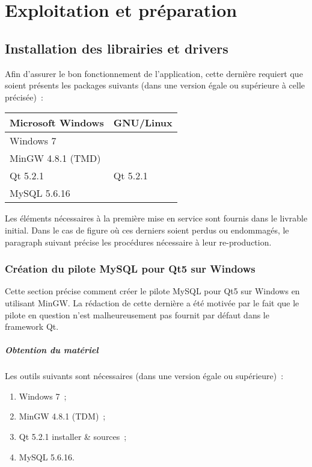 \chapter{Exploitation et préparation}

% 

\section{Installation des librairies et drivers}
Afin d'assurer le bon fonctionnement de l'application, cette dernière requiert que soient présents les packages suivants (dans une version égale ou supérieure à celle précisée)~:
\begin{tabularx}{\linewidth}{X X}
	\toprule
	Microsoft Windows	& GNU/Linux		\\
	\midrule
	Windows 7			&				\\
	MinGW 4.8.1 (TMD)	&				\\
	Qt 5.2.1			& Qt 5.2.1		\\
	MySQL 5.6.16		& 				\\
	\bottomrule
\end{tabularx}

Les éléments nécessaires à la première mise en service sont fournis dans le livrable initial.
Dans le cas de figure où ces derniers soient perdus ou endommagés, le paragraph suivant précise les procédures nécessaire à leur re-production.

\subsection{Création du pilote MySQL pour Qt5 sur Windows}
Cette section précise comment créer le pilote MySQL pour Qt5 sur Windows en utilisant MinGW.
La rédaction de cette dernière a été motivée par le fait que le pilote en question n'est malheureusement pas fournit par défaut dans le framework Qt.

\paragraph{Obtention du matériel}
Les outils suivants sont nécessaires (dans une version égale ou supérieure)~:
\begin{enumerate}
	\item Windows 7~;
	\item MinGW 4.8.1 (TDM)~;
	\item Qt 5.2.1 installer \& sources~;
	\item MySQL 5.6.16.
\end{enumerate}

